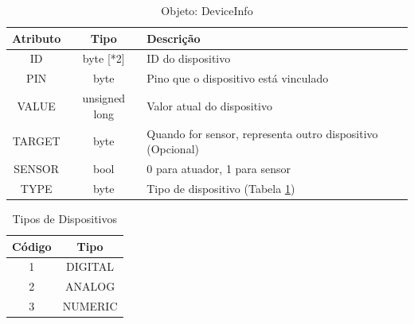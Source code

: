 \begin{table}[H]
\begin{centering}
\begin{tabular}{|c|c|l|}
\hline 
Atributo & Tipo & Descrição\tabularnewline
\hline 
\hline 
ID & byte {[}{*}2{]} & ID do dispositivo \tabularnewline
\hline 
PIN & byte & Pino que o dispositivo está vinculado\tabularnewline
\hline 
VALUE & unsigned long & Valor atual do dispositivo\tabularnewline
\hline 
TARGET & byte & Quando for sensor, representa outro dispositivo (Opcional)\tabularnewline
\hline 
SENSOR & bool & 0 para atuador, 1 para sensor\tabularnewline
\hline 
TYPE & byte & Tipo de dispositivo (Tabela \ref{tab:TipoDispositivo})\tabularnewline
\hline 
\end{tabular}
\par\end{centering}
\caption{Objeto: DeviceInfo}
\end{table}

\begin{table}[H]
\begin{centering}
\begin{tabular}{|c|c|}
\hline 
Código & Tipo\tabularnewline
\hline 
\hline 
1 & DIGITAL\tabularnewline
\hline 
2 & ANALOG\tabularnewline
\hline 
3 & NUMERIC\tabularnewline
\hline 
\end{tabular}
\par\end{centering}
\caption{Tipos de Dispositivos\label{tab:TipoDispositivo}}
\end{table}

